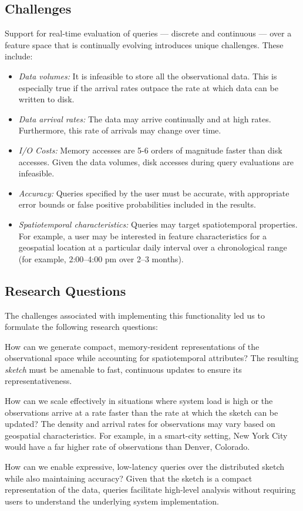 \subsection{Challenges}
Support for real-time evaluation of queries --- discrete and continuous --- over a feature space that is continually evolving introduces unique challenges. These include:
\begin{itemize}
    \item   \emph{Data volumes:} It is infeasible to store all the observational data. This is especially true if the arrival rates outpace the rate at which data can be written to disk.
    \item   \emph{Data arrival rates:} The data may arrive continually and at high rates. Furthermore, this rate of arrivals may change over time.
    \item \emph{I/O Costs:} Memory accesses are 5-6 orders of magnitude faster than disk accesses. Given the data volumes, disk accesses during query evaluations are infeasible.
    \item   \emph{Accuracy:} Queries specified by the user must be accurate, with appropriate error bounds or false positive probabilities included in the results.
    \item   \emph{Spatiotemporal characteristics:} Queries may target spatiotemporal properties. For example, a user may be interested in feature characteristics for a geospatial location at a particular daily interval over a chronological range (for example, 2:00--4:00 pm over 2--3 months).
\end{itemize}

\subsection{Research Questions}
The challenges associated with implementing this functionality led us to formulate the following research questions:
\begin{description}[leftmargin=*]
    \item[\emph{RQ-1:}] How can we generate compact, memory-resident representations of the observational space while accounting for spatiotemporal attributes? The resulting \emph{sketch} must be amenable to fast, continuous updates to ensure its representativeness.
    \item[\emph{RQ-2:}] How can we scale effectively in situations where system load is high or the observations arrive at a rate faster than the rate at which the sketch can be updated? The density and arrival rates for observations may vary based on geospatial characteristics. For example, in a smart-city setting, New York City would have a far higher rate of observations than Denver, Colorado.
    \item[\emph{RQ-3:}] How can we enable expressive, low-latency queries over the distributed sketch while also maintaining accuracy?  Given that the sketch is a compact representation of the data, queries facilitate high-level analysis without requiring users to understand the underlying system implementation.
\end{description}

